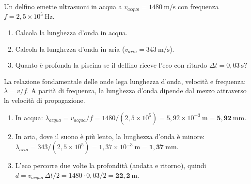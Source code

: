 \begin{question}[ID=1.1, subtitle={Ultrasuoni del delfino — lunghezza d'onda e profondità piscina}, tags={onde, lunghezza d'onda, eco}, difficulty=facile]
Un delfino emette ultrasuoni in acqua a $v_{acqua} = 1480\ \mathrm{m/s}$ con frequenza $f = 2{,}5\times10^5\ \mathrm{Hz}$.
\begin{enumerate}
\item Calcola la lunghezza d'onda in acqua.
\item Calcola la lunghezza d'onda in aria ($v_{aria} = 343\ \mathrm{m/s}$).
\item Quanto è profonda la piscina se il delfino riceve l'eco con ritardo $\Delta t = 0{,}03\ \mathrm{s}$?
\end{enumerate}
\begin{solution}
La relazione fondamentale delle onde lega lunghezza d'onda, velocità e frequenza: $\lambda = v/f$. A parità di frequenza, la lunghezza d'onda dipende dal mezzo attraverso la velocità di propagazione.
\begin{enumerate}
\item In acqua: $\lambda_{acqua} = v_{acqua}/f = 1480/(2{,}5\times10^5) = 5{,}92\times10^{-3}\ \mathrm{m} = \mathbf{5{,}92\ \mathrm{mm}}$.
\item In aria, dove il suono è più lento, la lunghezza d'onda è minore: $\lambda_{aria} = 343/(2{,}5\times10^5) = 1{,}37\times10^{-3}\ \mathrm{m} = \mathbf{1{,}37\ \mathrm{mm}}$.
\item L'eco percorre due volte la profondità (andata e ritorno), quindi $d = v_{acqua}\,\Delta t/2 = 1480\cdot0{,}03/2 = \mathbf{22{,}2\ \mathrm{m}}$.
\end{enumerate}
\end{solution}
\end{question}

